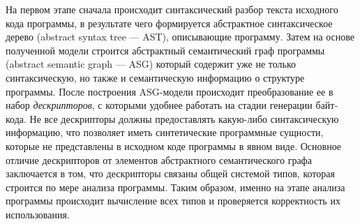 На первом этапе сначала происходит синтаксический разбор текста исходного кода программы, в результате чего формируется абстрактное синтаксическое дерево (abstract syntax tree --- AST), описывающие программу. Затем на основе полученной модели строится абстрактный семантический граф программы (abstract semantic graph --- ASG)
который содержит уже не только синтаксическую, но также и семантическую информацию о структуре программы. 
После построения ASG-модели происходит преобразование ее в набор \emph{дескрипторов}, с которыми удобнее работать на стадии генерации байт-кода. Не все дескрипторы должны предоставлять какую-либо синтаксическую информацию, что позволяет иметь синтетические программные сущности, которые не представлены в исходном коде программы в явном виде. Основное отличие дескрипторов от элементов абстрактного семантического графа заключается в том, что дескрипторы связаны общей системой типов, которая строится по мере анализа программы. Таким образом, именно на этапе анализа программы происходит вычисление всех  
типов и проверяется корректность их использования. 

